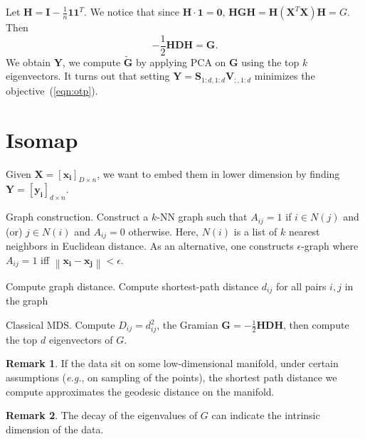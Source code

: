 \documentclass[11pt]{article}
\newcommand{\norm}[1]{\left\lVert#1\right\rVert}
\theoremstyle{definition}
\newtheorem{remark}{Remark}
\begin{document}
Let $\bm{H} = \bm{I} - \frac{1}{n}\bm{1}\bm{1}^T$. We notice that since $\bm{H \cdot 1} =\bm{0}$, $\bm{HGH} = \mathbf{H}(\bm{X}^T\bm{X})\bm{H} = G$. Then
\[
    - \frac{1}{2}\bm{HDH} = \bm{G}.
\]
We obtain $\bm{Y}$, we compute $\mathbf{\widetilde{G}}$ by applying PCA on $\bm{G}$ using the top $k$ eigenvectors. It turns out that setting $\bm{Y} = \bm{S}_{1:d,1:d} \bm{V}_{:,1:d}$ minimizes the objective~(\ref{eqn:otp}).

\section{Isomap}
Given $\mathbf{X} = [\mathbf{x_i}]_{D\times n}$, we want to embed them in lower dimension by finding $\mathbf{Y}= [\mathbf{y_i}]_{d\times n}$.
\begin{steps}
\item Graph construction. Construct a $k$-NN graph such that $A_{ij}=1 $ if $i\in N(j)$ and (or) $j\in N(i)$ and $A_{ij} =0$ otherwise. Here, $N(i)$ is a list of $k$ nearest neighbors in Euclidean distance. As an alternative, one constructs $\epsilon$-graph where $A_{ij}=1$  iff $\norm{\bm{x_i}-\bm{x_j}} < \epsilon$. 
    \item  Compute graph distance. Compute shortest-path distance $d_{ij}$ for all pairs $i,j$ in the graph 
    \item Classical MDS\@. Compute $D_{ij} =d^2_{ij}$, the Gramian $\bm{G}=-\frac{1}{2}\bm{HDH}$, then compute the top $d$ eigenvectors of $G$.
\end{steps}
\begin{remark}
    If the data sit on some low-dimensional manifold, under certain assumptions ({\it e.g.}, on sampling of the points), the shortest path distance we compute approximates the geodesic distance on the manifold.
\end{remark}
\begin{remark}
The decay of the eigenvalues of $G$ can indicate the intrinsic dimension of the data.
\end{remark}
\end{document}
